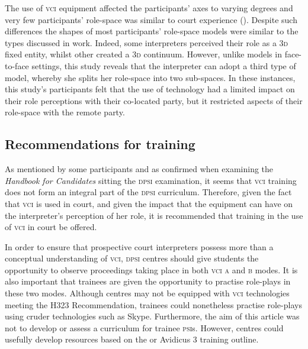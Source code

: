 \documentclass[output=paper]{langsci/langscibook}
\begin{document}
The use of \textsc{vci} equipment affected the participants’ axes to varying degrees and very few participants’ role-space was similar to  court experience (). Despite such differences the shapes of most participants’ role-space models were similar to the types discussed in  work. Indeed, some interpreters perceived their role as a \textsc{3d} fixed entity, whilst other created a \textsc{3d} continuum. However, unlike  models in face-to-face settings, this study reveals that the interpreter can adopt a third type of model, whereby she splits her role-space into two sub-spaces. In these instances, this study’s participants felt that the use of technology had a limited impact on their role perceptions with their co-located party, but it restricted aspects of their role-space with the remote party. 

\subsection{Recommendations for training}
As mentioned by some participants and as confirmed when examining the  \textit{Handbook for Candidates} sitting the \textsc{dpsi} examination, it seems that \textsc{vci} training does not form an integral part of the \textsc{dpsi} curriculum. Therefore, given the fact that \textsc{vci} is used in court, and given the impact that the equipment can have on the interpreter’s perception of her role, it is recommended that training in the use of \textsc{vci} in court be offered.  

In order to ensure that prospective court interpreters possess more than a conceptual understanding of \textsc{vci}, \textsc{dpsi} centres should give students the opportunity to observe proceedings taking place in both \textsc{vci a} and \textsc{b} modes. It is also important that trainees are given the opportunity to practise role-plays in these two modes. Although centres may not be equipped with \textsc{vci} technologies meeting the  H323 Recommendation, trainees could nonetheless practise role-plays using cruder technologies such as Skype. Furthermore, the aim of this article was not to develop or assess a curriculum for trainee \textsc{psi}s. However, centres could usefully develop resources based on the \citet{Braun2011c} or Avidicus 3 training outline. 
\end{document}

